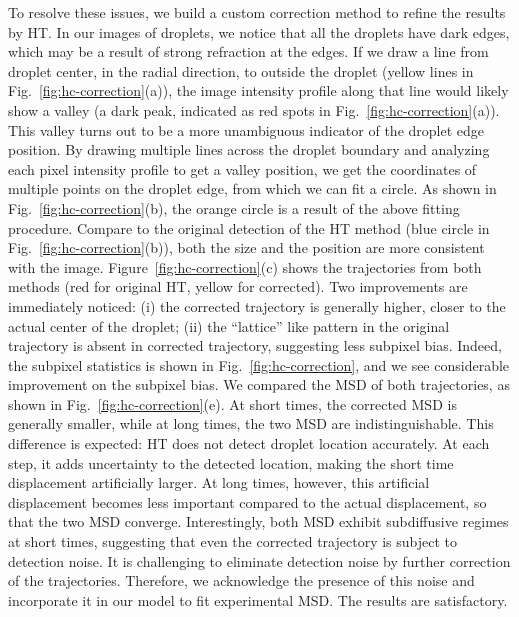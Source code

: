 \documentclass[%
10pt,
superscriptaddress,
twocolumn,
 amsmath,amssymb,
 aps,prx,
]{revtex4-2}
\begin{document}
To resolve these issues, we build a custom correction method to refine the results by HT.
In our images of droplets, we notice that all the droplets have dark edges, which may be a result of strong refraction at the edges. 
If we draw a line from droplet center, in the radial direction, to outside the droplet (yellow lines in Fig.~\ref{fig:hc-correction}(a)), the image intensity profile along that line would likely show a valley (a dark peak, indicated as red spots in Fig.~\ref{fig:hc-correction}(a)). 
This valley turns out to be a more unambiguous indicator of the droplet edge position. 
By drawing multiple lines across the droplet boundary and analyzing each pixel intensity profile to get a valley position, we get the coordinates of multiple points on the
droplet edge, from which we can fit a circle.
As shown in Fig.~\ref{fig:hc-correction}(b), the orange circle is a result of the above fitting procedure.
Compare to the original detection of the HT method (blue circle in Fig.~\ref{fig:hc-correction}(b)), both the size and the position are more consistent with the image. 
Figure~\ref{fig:hc-correction}(c) shows the trajectories from both methods (red for original HT, yellow for corrected).
Two improvements are immediately noticed: 
(i) the corrected trajectory is generally higher, closer to the actual center of the droplet;
(ii) the ``lattice'' like pattern in the original trajectory is absent in corrected trajectory, suggesting less subpixel bias.
Indeed, the subpixel statistics is shown in Fig.~\ref{fig:hc-correction}, and we see considerable improvement on the subpixel bias. 
We compared the MSD of both trajectories, as shown in Fig.~\ref{fig:hc-correction}(e).
At short times, the corrected MSD is generally smaller, while at long times, the two MSD are indistinguishable. 
This difference is expected: HT does not detect droplet location accurately. 
At each step, it adds uncertainty to the detected location, making the short time displacement artificially larger.
At long times, however, this artificial displacement becomes less important compared to the actual displacement, so that the two MSD converge.
Interestingly, both MSD exhibit subdiffusive regimes at short times, suggesting that even the corrected trajectory is subject to detection noise.
It is challenging to eliminate detection noise by further correction of the trajectories.
Therefore, we acknowledge the presence of this noise and incorporate it in our model to fit experimental MSD.
The results are satisfactory.  
\end{document}
